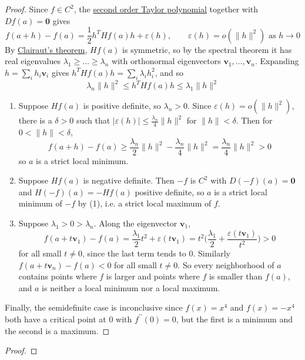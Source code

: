   \begin{proof}
    Since $f \in C^2$, the \hyperref[thm:2nd-order-taylor-polynomial]{second order Taylor polynomial} together with $Df(a) = \mathbf{0}$ gives 
    \begin{equation}
      f(a + h) - f(a) = \frac{1}{2} h^T H f(a) h + \varepsilon(h), \qquad \varepsilon(h) = o(\|h\|^2) \text{ as } h \to 0
    \end{equation}
    By \hyperref[thm:clairuts-theorem]{Clairaut's theorem}, $H f(a)$ is symmetric, so by the spectral theorem it has real eigenvalues $\lambda_1 \geq \ldots \geq \lambda_n$ with orthonormal eigenvectors $\mathbf{v}_1, \ldots, \mathbf{v}_n$. Expanding $h = \sum_i h_i \mathbf{v}_i$ gives $h^T H f(a) h = \sum_i \lambda_i h_i^2$, and so 
    \begin{equation}
      \lambda_n \|h\|^2 \leq h^T H f(a) h \leq \lambda_1 \|h\|^2
    \end{equation}
    \begin{enumerate}
      \item Suppose $H f(a)$ is positive definite, so $\lambda_n > 0$. Since $\varepsilon(h) = o(\|h\|^2)$, there is a $\delta > 0$ such that $|\varepsilon(h)| \leq \frac{\lambda_n}{4} \|h\|^2$ for $\|h\| < \delta$. Then for $0 < \|h\| < \delta$, 
      \begin{equation}
        f(a + h) - f(a) \geq \frac{\lambda_n}{2} \|h\|^2 - \frac{\lambda_n}{4} \|h\|^2 = \frac{\lambda_n}{4} \|h\|^2 > 0
      \end{equation}
      so $a$ is a strict local minimum. 

      \item Suppose $H f(a)$ is negative definite. Then $-f$ is $C^2$ with $D(-f)(a) = \mathbf{0}$ and $H(-f)(a) = -H f(a)$ positive definite, so $a$ is a strict local minimum of $-f$ by (1), i.e. a strict local maximum of $f$. 

      \item Suppose $\lambda_1 > 0 > \lambda_n$. Along the eigenvector $\mathbf{v}_1$, 
      \begin{equation}
        f(a + t \mathbf{v}_1) - f(a) = \frac{\lambda_1}{2} t^2 + \varepsilon(t \mathbf{v}_1) = t^2 \bigg( \frac{\lambda_1}{2} + \frac{\varepsilon(t \mathbf{v}_1)}{t^2} \bigg) > 0
      \end{equation}
      for all small $t \neq 0$, since the last term tends to $0$. Similarly $f(a + t \mathbf{v}_n) - f(a) < 0$ for all small $t \neq 0$. So every neighborhood of $a$ contains points where $f$ is larger and points where $f$ is smaller than $f(a)$, and $a$ is neither a local minimum nor a local maximum. 
    \end{enumerate}
    Finally, the semidefinite case is inconclusive since $f(x) = x^4$ and $f(x) = -x^4$ both have a critical point at $0$ with $f^{\prime\prime}(0) = 0$, but the first is a minimum and the second is a maximum. 
  \end{proof}
	\begin{proof}
	  
	\end{proof}

